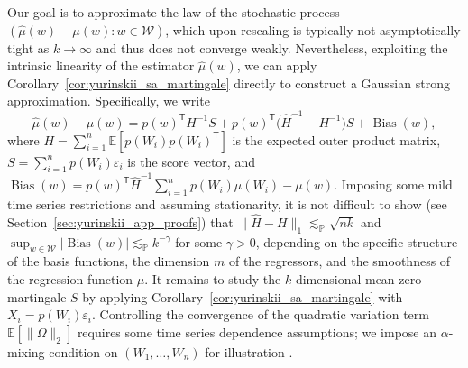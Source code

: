 \documentclass[11pt,lof]{puthesis}
\renewcommand{\P}{\ensuremath{\mathbb{P}}}
\newcommand{\E}{\ensuremath{\mathbb{E}}}
\newcommand{\cW}{\ensuremath{\mathcal{W}}}
\newcommand{\T}{\ensuremath{\mathsf{T}}}
\DeclareMathOperator{\Bias}{Bias}
\theoremstyle{break}
\theoremstyle{proof}
\begin{document}
Our goal is to approximate the law of the stochastic process
$(\hat\mu(w)-\mu(w):w\in\cW)$, which upon rescaling is typically not
asymptotically tight as $k \to \infty$ and thus does not converge weakly.
Nevertheless, exploiting the intrinsic linearity of the estimator $\hat\mu(w)$,
we can apply Corollary~\ref{cor:yurinskii_sa_martingale} directly to construct
a Gaussian
strong approximation. Specifically, we write
%
\begin{equation*}
  \hat\mu(w) - \mu(w)
  = p(w)^\T H^{-1} S
  + p(w)^\T \big(\hat H^{-1} - H^{-1}\big) S
  + \Bias(w),
\end{equation*}
%
where $H= \sum_{i=1}^n \E\left[p(W_i) p(W_i)^\T\right]$
is the expected outer product matrix, $S = \sum_{i=1}^n p(W_i) \varepsilon_i$
is the score vector, and
$\Bias(w) = p(w)^{\T} \hat H^{-1}\sum_{i=1}^n p(W_i) \mu(W_i) - \mu(w)$.
Imposing some mild time series restrictions and assuming stationarity,
it is not difficult to show
(see Section~\ref{sec:yurinskii_app_proofs})
that $\|\hat H - H\|_1 \lesssim_\P \sqrt{n k}$ and
$\sup_{w\in\cW} |\Bias(w)| \lesssim_\P k^{-\gamma}$
for some $\gamma>0$, depending on the specific structure of the basis
functions, the dimension $m$ of the regressors, and the smoothness of the
regression function $\mu$. It remains to study the $k$-dimensional
mean-zero martingale $S$ by applying
Corollary~\ref{cor:yurinskii_sa_martingale} with
$X_i=p(W_i) \varepsilon_i$. Controlling the convergence of the quadratic
variation term $\E[\|\Omega\|_2]$ requires some time series dependence
assumptions; we impose an $\alpha$-mixing condition on $(W_1, \ldots, W_n)$ for
illustration \citep{bradley2005basic}.
\end{document}

